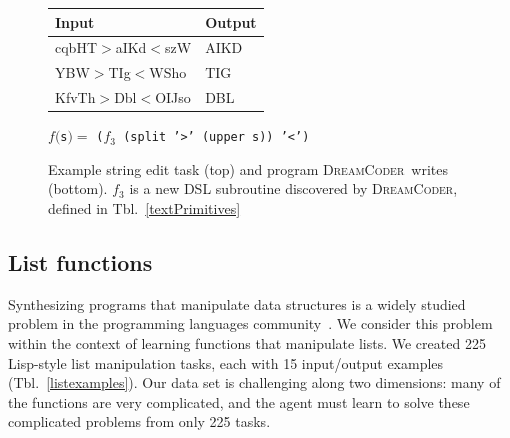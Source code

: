 \documentclass{article}
\newcommand{\system}{\textsc{DreamCoder}~}
\newcommand{\systemEnding}{\textsc{DreamCoder}}
\newcommand{\code}[1]{{\footnotesize\texttt{#1}}}
\begin{document}
\begin{figure}
  \centering\begin{tabular}{ll}\toprule
    Input&Output\\\midrule
cqbHT$>$aIKd$<$szW& 	AIKD\\
YBW$>$TIg$<$WSho 	&TIG\\
KfvTh$>$Dbl$<$OIJso 	&DBL
    \\\bottomrule
  \end{tabular}
  
  \vspace{0.25cm}
  
  \begin{minipage}{7.5cm}
 $f($\code{s}$) = $   \code{(}$f_3$\code{ (split '>' (upper s)) '<')}
    \end{minipage}
  \caption{Example string edit task (top) and program  \system writes (bottom). $f_3$ is a new DSL subroutine discovered by \systemEnding, defined in Tbl.~\ref{textPrimitives}}\label{exampleTextProblem}
  \end{figure}

\subsection{List functions}
Synthesizing programs that manipulate data structures is
a widely studied problem in the programming languages community~\cite{feser2015synthesizing}.
We consider this problem within the context of
learning functions that manipulate lists.
We created 225 Lisp-style list manipulation tasks,
each with 15 input/output examples (Tbl.~\ref{listexamples}).
Our data set is challenging along two dimensions:
many of the functions are very complicated,
and the agent must learn to solve these complicated problems from only 225 tasks.

\end{document}
